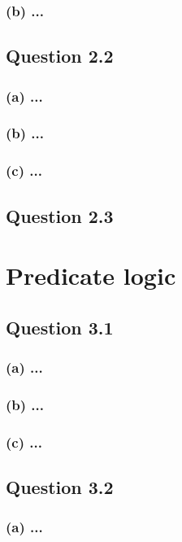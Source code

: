 \documentclass[10pt,a4paper]{article}
\begin{document}
\subsubsection*{(b) \mdseries ...}

\subsection*{Question 2.2}
\subsubsection*{(a) \mdseries ...}
\subsubsection*{(b) \mdseries ...}
\subsubsection*{(c) \mdseries ...}

\subsection*{Question 2.3}

\section{Predicate logic}
\subsection*{Question 3.1}
\subsubsection*{(a) \mdseries ...}
\subsubsection*{(b) \mdseries ...}
\subsubsection*{(c) \mdseries ...}

\subsection*{Question 3.2}
\subsubsection*{(a) \mdseries ...}
\end{document}
